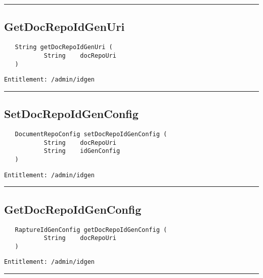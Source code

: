 \rule{12cm}{2pt}
\subsection{GetDocRepoIdGenUri}
\label{Api:GetDocRepoIdGenUri}
\begin{Verbatim}
   String getDocRepoIdGenUri (
           String    docRepoUri
   )
\end{Verbatim}
\begin{Verbatim}[formatcom=\color{Maroon}]
  Entitlement: /admin/idgen
\end{Verbatim}



\rule{12cm}{2pt}
\subsection{SetDocRepoIdGenConfig}
\label{Api:SetDocRepoIdGenConfig}
\begin{Verbatim}
   DocumentRepoConfig setDocRepoIdGenConfig (
           String    docRepoUri
           String    idGenConfig
   )
\end{Verbatim}
\begin{Verbatim}[formatcom=\color{Maroon}]
  Entitlement: /admin/idgen
\end{Verbatim}



\rule{12cm}{2pt}
\subsection{GetDocRepoIdGenConfig}
\label{Api:GetDocRepoIdGenConfig}
\begin{Verbatim}
   RaptureIdGenConfig getDocRepoIdGenConfig (
           String    docRepoUri
   )
\end{Verbatim}
\begin{Verbatim}[formatcom=\color{Maroon}]
  Entitlement: /admin/idgen
\end{Verbatim}



\rule{12cm}{2pt}
